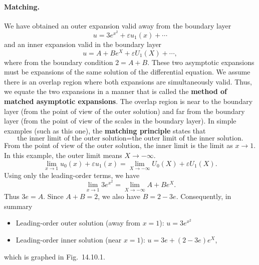 \paragraph{Matching.}
We have obtained an outer expansion valid away from the boundary layer
\[
u = 3e^{x^2} + \varepsilon u_1(x) + \cdots
\]
and an inner expansion valid in the boundary layer
\[
u = A + Be^X + \varepsilon U_1(X) + \cdots,
\]
where from the boundary condition $2 = A + B$. These two asymptotic expansions must be expansions of the same solution of the differential equation. We assume there is an overlap region where both expansions are simultaneously valid. Thus, we equate the two expansions in a manner that is called the \textbf{method of matched asymptotic expansions}. The overlap region is near to the boundary layer (from the point of view of the outer solution) and far from the boundary layer (from the point of view of the scales in the boundary layer). In simple examples (such as this one), the \textbf{matching principle} states that
\begin{equation}
\boxed{\text{the inner limit of the outer solution} = \text{the outer limit of the inner solution.}}
\label{eq:14.10.27}
\end{equation}
From the point of view of the outer solution, the inner limit is the limit as $x \to 1$. In this example, the outer limit means $X \to -\infty$.
\begin{equation}
\lim_{x \to 1} u_0(x) + \varepsilon u_1(x) = \lim_{X \to -\infty} U_0(X) + \varepsilon U_1(X).
\label{eq:14.10.28}
\end{equation}
Using only the leading-order terms, we have
\begin{equation}
\lim_{x \to 1} 3e^{x^2} = \lim_{X \to -\infty} A + Be^X.
\label{eq:14.10.29}
\end{equation}
Thus $3e = A$. Since $A + B = 2$, we also have $B = 2 - 3e$. Consequently, in summary
\begin{itemize}
\item Leading-order outer solution (away from $x = 1$): $u = 3e^{x^2}$
\item Leading-order inner solution (near $x = 1$): $u = 3e + (2 - 3e)e^X$,
\end{itemize}
which is graphed in Fig.\ 14.10.1.

